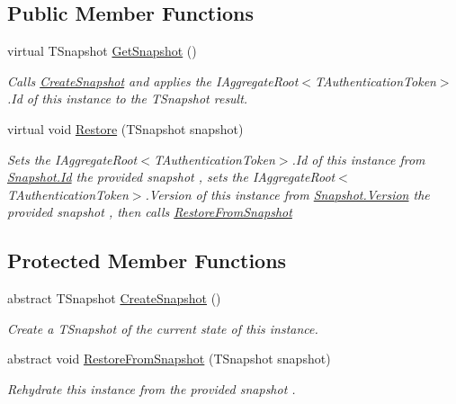 \subsection*{Public Member Functions}
\begin{DoxyCompactItemize}
\item 
virtual T\+Snapshot \hyperlink{classCqrs_1_1Snapshots_1_1SnapshotAggregateRoot_a30ec8fe3a09fec8238c5921c629a5ac1_a30ec8fe3a09fec8238c5921c629a5ac1}{Get\+Snapshot} ()
\begin{DoxyCompactList}\small\item\em Calls \hyperlink{classCqrs_1_1Snapshots_1_1SnapshotAggregateRoot_a2d8cd57c7b6c2696d286c6dc5e9f0479_a2d8cd57c7b6c2696d286c6dc5e9f0479}{Create\+Snapshot} and applies the I\+Aggregate\+Root$<$\+T\+Authentication\+Token$>$.\+Id of this instance to the {\itshape T\+Snapshot}  result. \end{DoxyCompactList}\item 
virtual void \hyperlink{classCqrs_1_1Snapshots_1_1SnapshotAggregateRoot_a0b39f2941c828d987c84dc6cbb0a02be_a0b39f2941c828d987c84dc6cbb0a02be}{Restore} (T\+Snapshot snapshot)
\begin{DoxyCompactList}\small\item\em Sets the I\+Aggregate\+Root$<$\+T\+Authentication\+Token$>$.\+Id of this instance from \hyperlink{classCqrs_1_1Snapshots_1_1Snapshot_a0da54bdfa43e46a17f6e6aa88d1f3b67_a0da54bdfa43e46a17f6e6aa88d1f3b67}{Snapshot.\+Id} the provided {\itshape snapshot} , sets the I\+Aggregate\+Root$<$\+T\+Authentication\+Token$>$.\+Version of this instance from \hyperlink{classCqrs_1_1Snapshots_1_1Snapshot_a59c0a399430e5f4a1b27d999c3bb5d4f_a59c0a399430e5f4a1b27d999c3bb5d4f}{Snapshot.\+Version} the provided {\itshape snapshot} , then calls \hyperlink{classCqrs_1_1Snapshots_1_1SnapshotAggregateRoot_aefe31de169e33147439a69017a4fd3f7_aefe31de169e33147439a69017a4fd3f7}{Restore\+From\+Snapshot} \end{DoxyCompactList}\end{DoxyCompactItemize}
\subsection*{Protected Member Functions}
\begin{DoxyCompactItemize}
\item 
abstract T\+Snapshot \hyperlink{classCqrs_1_1Snapshots_1_1SnapshotAggregateRoot_a2d8cd57c7b6c2696d286c6dc5e9f0479_a2d8cd57c7b6c2696d286c6dc5e9f0479}{Create\+Snapshot} ()
\begin{DoxyCompactList}\small\item\em Create a {\itshape T\+Snapshot}  of the current state of this instance. \end{DoxyCompactList}\item 
abstract void \hyperlink{classCqrs_1_1Snapshots_1_1SnapshotAggregateRoot_aefe31de169e33147439a69017a4fd3f7_aefe31de169e33147439a69017a4fd3f7}{Restore\+From\+Snapshot} (T\+Snapshot snapshot)
\begin{DoxyCompactList}\small\item\em Rehydrate this instance from the provided {\itshape snapshot} . \end{DoxyCompactList}\end{DoxyCompactItemize}
